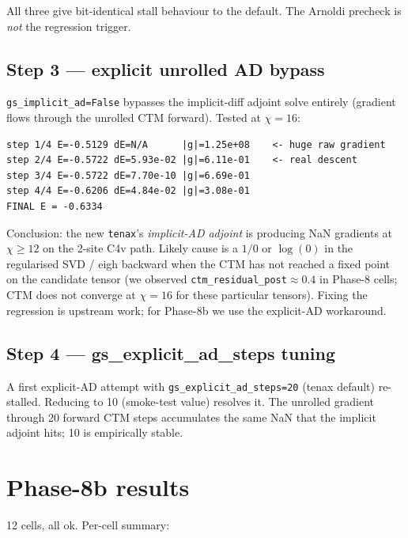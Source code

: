 \documentclass[aps,prresearch,reprint,amsmath,amssymb,floatfix]{revtex4-2}
\newcommand{\tenax}{\texttt{tenax}}
\newcommand{\code}[1]{\texttt{#1}}
\begin{document}
All three give bit-identical stall behaviour to the default.  The
Arnoldi precheck is \emph{not} the regression trigger.

\subsection{Step 3 --- explicit unrolled AD bypass}

\code{gs\_implicit\_ad=False} bypasses the implicit-diff adjoint solve
entirely (gradient flows through the unrolled CTM forward).  Tested at
$\chi=16$:

\begin{verbatim}
step 1/4 E=-0.5129 dE=N/A      |g|=1.25e+08    <- huge raw gradient
step 2/4 E=-0.5722 dE=5.93e-02 |g|=6.11e-01    <- real descent
step 3/4 E=-0.5722 dE=7.70e-10 |g|=6.69e-01
step 4/4 E=-0.6206 dE=4.84e-02 |g|=3.08e-01
FINAL E = -0.6334
\end{verbatim}

Conclusion: the new \tenax{}'s \emph{implicit-AD adjoint} is producing
NaN gradients at $\chi\!\geq\!12$ on the 2-site C4v path. Likely cause is a
$1/0$ or $\log(0)$ in the regularised SVD / eigh backward when the CTM has
not reached a fixed point on the candidate tensor (we observed
\code{ctm\_residual\_post}$\approx 0.4$ in Phase-8 cells; CTM does not
converge at $\chi=16$ for these particular tensors). Fixing the regression
is upstream work; for Phase-8b we use the explicit-AD workaround.

\subsection{Step 4 --- gs\_explicit\_ad\_steps tuning}

A first explicit-AD attempt with \code{gs\_explicit\_ad\_steps=20}
(tenax default) re-stalled.  Reducing to 10 (smoke-test value) resolves
it. The unrolled gradient through 20 forward CTM steps accumulates the
same NaN that the implicit adjoint hits; 10 is empirically stable.

\section{Phase-8b results}

12 cells, all ok.  Per-cell summary:
\end{document}
